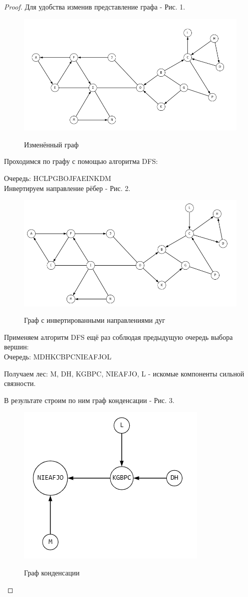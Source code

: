 \begin{proof}
 Для удобства изменив представление графа - Рис. 1.
 
    \begin{figure}[h]
    \centering
     \includegraphics[width=0.7\linewidth]{pics/8thGraphSol.png}
     \label{fig:dm}
     \caption{Изменённый граф}
    \end{figure}
 
 Проходимся по графу с помощью алгоритма DFS:
 
 Очередь: HCLPGBOJFAEINKDM\\

 Инвертируем направление рёбер - Рис. 2.

 \begin{figure}[h]
    \centering
     \includegraphics[width=0.7\linewidth]{pics/8thInverGraph.png}
     \label{fig:dm}
     \caption{Граф с инвертированными направлениями дуг}
    \end{figure}
 
 Применяем алгоритм DFS ещё раз соблюдая предыдущую очередь выбора вершин:\\
 
 Очередь: MDHKCBPCNIEAFJOL

 Получаем лес: M, DH, KGBPC, NIEAFJO, L - искомые компоненты сильной связности.
 
 В результате строим по ним граф конденсации - Рис. 3.

 \begin{figure}[h]
    \centering
     \includegraphics[width=0.3\linewidth]{pics/8thCondensGraph.png}
     \label{fig:dm}
     \caption{Граф конденсации}
    \end{figure}
\end{proof}

